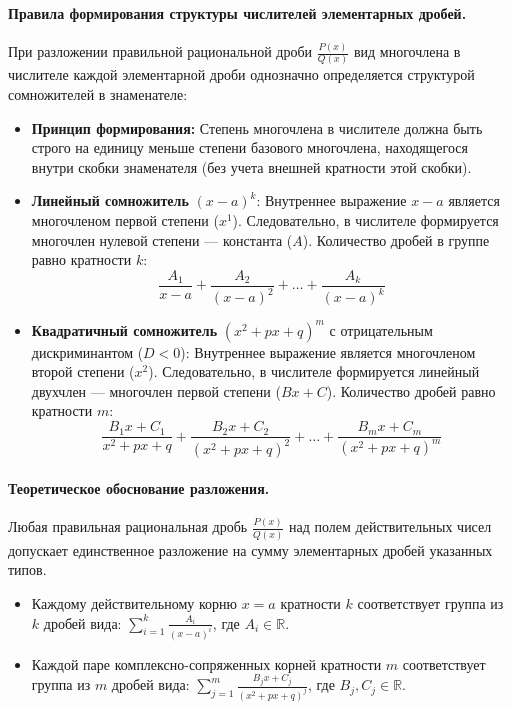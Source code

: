 \paragraph{Правила формирования структуры числителей элементарных дробей.}
При разложении правильной рациональной дроби $\frac{P(x)}{Q(x)}$ вид многочлена в числителе каждой элементарной дроби однозначно определяется структурой сомножителей в знаменателе:
\begin{itemize}
    \item \textbf{Принцип формирования:} Степень многочлена в числителе должна быть строго на единицу меньше степени базового многочлена, находящегося внутри скобки знаменателя (без учета внешней кратности этой скобки).
    \item \textbf{Линейный сомножитель} $(x - a)^k$: Внутреннее выражение $x - a$ является многочленом первой степени ($x^1$). Следовательно, в числителе формируется многочлен нулевой степени — константа ($A$). Количество дробей в группе равно кратности $k$:
    $$ \frac{A_1}{x-a} + \frac{A_2}{(x-a)^2} + \dots + \frac{A_k}{(x-a)^k} $$
    \item \textbf{Квадратичный сомножитель} $(x^2 + px + q)^m$ с отрицательным дискриминантом ($D < 0$): Внутреннее выражение является многочленом второй степени ($x^2$). Следовательно, в числителе формируется линейный двухчлен — многочлен первой степени ($Bx + C$). Количество дробей равно кратности $m$:
    $$ \frac{B_1 x + C_1}{x^2 + px + q} + \frac{B_2 x + C_2}{(x^2 + px + q)^2} + \dots + \frac{B_m x + C_m}{(x^2 + px + q)^m} $$
\end{itemize}

\paragraph{Теоретическое обоснование разложения.}
Любая правильная рациональная дробь $\frac{P(x)}{Q(x)}$ над полем действительных чисел допускает единственное разложение на сумму элементарных дробей указанных типов. 
\begin{itemize}
    \item Каждому действительному корню $x = a$ кратности $k$ соответствует группа из $k$ дробей вида: $\sum_{i=1}^{k} \frac{A_i}{(x-a)^i}$, где $A_i \in \mathbb{R}$.
    \item Каждой паре комплексно-сопряженных корней кратности $m$ соответствует группа из $m$ дробей вида: $\sum_{j=1}^{m} \frac{B_j x + C_j}{(x^2+px+q)^j}$, где $B_j, C_j \in \mathbb{R}$.
\end{itemize}

